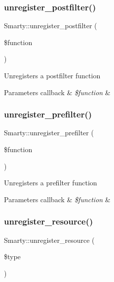 \subsubsection{\texorpdfstring{unregister\+\_\+postfilter()}{unregister\_postfilter()}}
{\footnotesize\ttfamily Smarty\+::unregister\+\_\+postfilter (\begin{DoxyParamCaption}\item[{}]{\$function }\end{DoxyParamCaption})}

Unregisters a postfilter function


\begin{DoxyParams}[1]{Parameters}
callback & {\em \$function} & \\
\hline
\end{DoxyParams}
\mbox{\label{class_smarty_a2c799f52830b86afa153afaaa79028e2}} 
\subsubsection{\texorpdfstring{unregister\+\_\+prefilter()}{unregister\_prefilter()}}
{\footnotesize\ttfamily Smarty\+::unregister\+\_\+prefilter (\begin{DoxyParamCaption}\item[{}]{\$function }\end{DoxyParamCaption})}

Unregisters a prefilter function


\begin{DoxyParams}[1]{Parameters}
callback & {\em \$function} & \\
\hline
\end{DoxyParams}
\mbox{\label{class_smarty_aced4c3f27800c1a81c652fcf39fe9364}} 
\subsubsection{\texorpdfstring{unregister\+\_\+resource()}{unregister\_resource()}}
{\footnotesize\ttfamily Smarty\+::unregister\+\_\+resource (\begin{DoxyParamCaption}\item[{}]{\$type }\end{DoxyParamCaption})}

